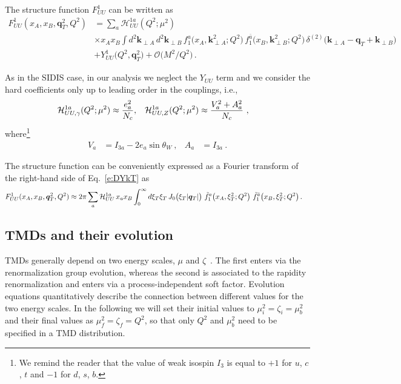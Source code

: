 \documentclass[aps,preprintnumbers,showpacs,nofootinbib,superscriptaddress,floatfix]{revtex4}
\newcommand{\AS}[1]{{\textcolor[rgb]{1,0,1}{#1}}}
\newcommand{\T}{\perp}
\newcommand{\bT}{\xi_T}
\begin{document}
The structure function $F_{UU}^1$ can be written as
\begin{align}
\label{e:DYkT}
   F_{UU}^1(x_A,x_B, \bm{q}_{T}^2, Q^2) &= \sum_a \mathcal{H}_{UU}^{1 a}(Q^2;\mu^2) \\ 
      &\times x_A x_B \int d^2\bm{k}_{\T A}^{} \, d^2\bm{k}_{\T B}^{} 
\,  f_1^a\big(x_A,\bm{k}_{\T A}^2; Q^2 \big) 
\, f_{1}^{\bar{a}}\big(x_B,\bm{k}_{\T B}^2; Q^2 \big) \,
      \delta^{(2)} \big({\bm k}_{\T A} - {\bm q}_T + {\bm k}_{\T B}\big)
\nonumber\\&
\nonumber + Y_{UU}^1\big(Q^2, \bm{q}_T^2\big) + \mathcal{O}\big(M^2/Q^2\big) \, .
\end{align} 


As in the SIDIS case, in our analysis we neglect the $Y_{UU}$ term
and we consider the hard coefficients only up to leading order in
the couplings, i.e.,
\begin{align} 
{\cal H}_{UU, \gamma}^{1 a}(Q^2;\mu^2) &\approx \frac{e_a^2}{N_c},
&
{\cal H}_{UU, Z}^{1 a}(Q^2;\mu^2) &\approx \frac{V_a^2+A_a^2}{N_c} \ ,
\end{align}  
where\footnote{We remind the reader that the value of weak isospin $I_3$ is equal to $+1$ for $u$, $c$, $t$ and
  $-1$ for $d$, $s$, $b$.}
\begin{align}
V_a & = I_{3a} - 2 e_{a} \sin \theta_W \  ,
&
A_a & = I_{3a} \  .
\end{align} 

The structure function can be conveniently expressed as a Fourier transform of
the right-hand side of Eq.~\eqref{e:DYkT} as 
\begin{align}
\label{e:DYkTFF}
   F_{UU}^1(x_A,x_B, \bm{q}_T^2, Q^2) &\approx
 2\pi \sum_a {\cal H}_{UU}^{1 a} \,x_a x_B \int_0^{\infty} d \bT \bT\, J_0\big( \bT |\bm{q}_T|\big)\ 
      \tilde{f}_1^a\big(x_A, \bT^2;Q^2\big) \   \tilde{f}_1^{\bar{a}}\big(x_B, \bT^2;Q^2 \big)  \, .
\end{align} 



\subsection{TMDs and their evolution}
\label{ss:TMDevo}

\AS{TMDs generally depend on two energy scales, $\mu$ and $\zeta$~\cite{Collins:2011zzd}. 
The first enters via the renormalization group evolution, whereas the second is associated to the rapidity renormalization and enters via a process-independent soft factor. 
Evolution equations quantitatively describe the connection between different values for the two energy scales. 
In the following we will set their initial values to $\mu_i^2=\zeta_i=\mu_b^2$ and their final values as $\mu_f^2=\zeta_f=Q^2$, so that only $Q^2$ and $\mu_b^2$ need to be specified in a TMD distribution.}
\end{document}
